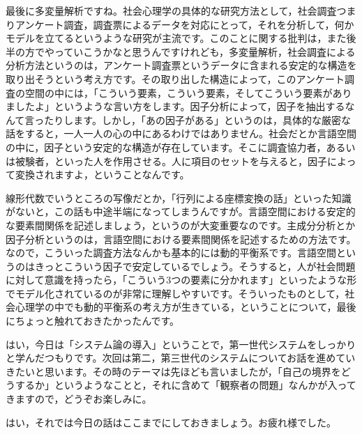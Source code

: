 \documentclass{ltjsbook}
\begin{document}
最後に多変量解析ですね。社会心理学の具体的な研究方法として，社会調査つまりアンケート調査，調査票によるデータを対応にとって，それを分析して，何かモデルを立てるというような研究が主流です。このことに関する批判は，また後半の方でやっていこうかなと思うんですけれども，多変量解析，社会調査による分析方法というのは，アンケート調査票というデータに含まれる安定的な構造を取り出そうという考え方です。その取り出した構造によって，このアンケート調査の空間の中には，「こういう要素，こういう要素，そしてこういう要素がありましたよ」というような言い方をします。因子分析によって，因子を抽出するなんて言ったりします。しかし，「あの因子がある」というのは，具体的な厳密な話をすると，一人一人の心の中にあるわけではありません。社会だとか言語空間の中に，因子という安定的な構造が存在しています。そこに調査協力者，あるいは被験者，といった人を作用させる。人に項目のセットを与えると，因子によって変換されますよ，ということなんです。

線形代数でいうところの写像だとか，「行列による座標変換の話」といった知識がないと，この話も中途半端になってしまうんですが。言語空間における安定的な要素間関係を記述しましょう，というのが大変重要なのです。主成分分析とか因子分析というのは，言語空間における要素間関係を記述するための方法です。なので，こういった調査方法なんかも基本的には動的平衡系です。言語空間というのはきっとこういう因子で安定しているでしょう。そうすると，人が社会問題に対して意識を持ったら，「こういう3つの要素に分かれます」といったような形でモデル化されているのが非常に理解しやすいです。そういったものとして，社会心理学の中でも動的平衡系の考え方が生きている，ということについて，最後にちょっと触れておきたかったんです。



はい，今日は「システム論の導入」ということで，第一世代システムをしっかりと学んだつもりです。次回は第二，第三世代のシステムについてお話を進めていきたいと思います。その時のテーマは先ほども言いましたが，「自己の境界をどうするか」というようなことと，それに含めて「観察者の問題」なんかが入ってきますので，どうぞお楽しみに。

はい，それでは今日の話はここまでにしておきましょう。お疲れ様でした。

\printbibliography[title=引用文献]
\end{document}
